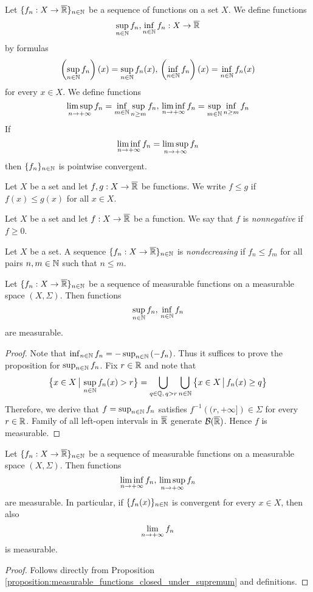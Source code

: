 Let $\{f_n:X\rightarrow \overline{{\mathbb R}}\}_{n\in {\mathbb N}}$ be a sequence of functions on a set $X$. We define functions
$$\sup_{n\in {\mathbb N}}f_n,\inf_{n\in {\mathbb N}}f_n:X\rightarrow \overline{{\mathbb R}}$$
by formulas
$$\left(\sup_{n\in {\mathbb N}}f_n\right)(x) = \sup_{n\in {\mathbb N}}f_n(x),\,\left(\inf_{n\in {\mathbb N}}f_n\right)(x) = \inf_{n\in {\mathbb N}}f_n(x)$$
for every $x\in X$. We define functions
$$\limsup_{n\rightarrow +\infty}f_n = \inf_{m\in {\mathbb N}}\sup_{n\geq m}f_n,\,\liminf_{n\rightarrow +\infty}f_n = \sup_{m\in {\mathbb N}}\inf_{n\geq m}f_n$$
If
$$\liminf_{n\rightarrow +\infty}f_n = \limsup_{n\rightarrow +\infty}f_n$$
then $\{f_n\}_{n\in {\mathbb N}}$ is pointwise convergent.

Let $X$ be a set and let $f,g:X\rightarrow \overline{{\mathbb R}}$ be functions. We write $f \leq g$ if $f(x) \leq g(x)$ for all $x\in X$.

\begin{definition}
    Let $X$ be a set and let $f:X\rightarrow \overline{{\mathbb R}}$ be a function. We say that $f$ is \textit{nonnegative} if $f \geq 0$.
\end{definition}

\begin{definition}
    Let $X$ be a set. A sequence $\{f_n:X\rightarrow \overline{{\mathbb R}}\}_{n\in {\mathbb N}}$ is \textit{nondecreasing} if $f_n \leq f_m$ for all pairs $n, m\in {\mathbb N}$ such that $n\leq m$.
\end{definition}

\begin{proposition}\label{proposition:measurable_functions_closed_under_supremum}
    Let $\{f_n:X\rightarrow \overline{{\mathbb R}}\}_{n\in {\mathbb N}}$ be a sequence of measurable functions on a measurable space $(X,\Sigma)$. Then functions
    $$\sup_{n\in {\mathbb N}}f_n,\,\inf_{n\in {\mathbb N}}f_n$$
    are measurable.
\end{proposition}
\begin{proof}
    Note that $\inf_{n\in {\mathbb N}}f_n = -\sup_{n\in {\mathbb N}}\left(-f_n\right)$. Thus it suffices to prove the proposition for $\sup_{n\in {\mathbb N}}f_n$. Fix $r \in {\mathbb R}$ and note that
    $$\big\{x\in X\,\big|\,\sup_{n\in {\mathbb N}}f_n(x) > r\big\} = \bigcup_{q\in {\mathbb Q},\,q > r}\bigcup_{n\in {\mathbb N}}\big\{x\in X\,\big|\,f_n(x) \geq q\big\}$$
    Therefore, we derive that $f = \sup_{n\in {\mathbb N}}f_n$ satisfies $f^{-1}\left((r,+
        \infty]\right)\in \Sigma$ for every $r \in {\mathbb R}$. Family of all left-open intervals in $\overline{{\mathbb R}}$ generate ${\mathcal B}(\overline{{\mathbb R}})$. Hence $f$ is measurable.
\end{proof}

\begin{corollary}\label{corollary:measurable_closed_under_limes_inferior}
    Let $\{f_n:X\rightarrow \overline{{\mathbb R}}\}_{n\in {\mathbb N}}$ be a sequence of measurable functions on a measurable space $(X,\Sigma)$. Then functions
    $$\liminf_{n \rightarrow +\infty}f_n,\,\limsup_{n\rightarrow +\infty}f_n$$
    are measurable. In particular, if $\{f_n(x)\}_{n\in {\mathbb N}}$ is convergent for every $x\in X$, then also $$\lim_{n\rightarrow +\infty}f_n$$
    is measurable.
\end{corollary}
\begin{proof}
    Follows directly from Proposition \ref{proposition:measurable_functions_closed_under_supremum} and definitions.
\end{proof}

